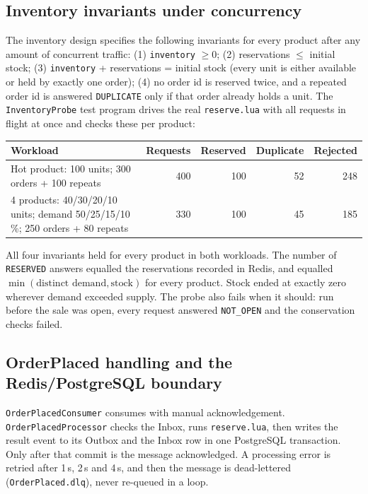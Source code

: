 \documentclass[a4paper]{report}
\begin{document}
\subsection{Inventory invariants under concurrency}

The inventory design specifies the following invariants for every product
after any amount of concurrent traffic:
(1) \texttt{inventory} $\ge 0$;
(2) reservations $\le$ initial stock;
(3) \texttt{inventory} + reservations = initial stock (every unit is either
available or held by exactly one order);
(4) no order id is reserved twice, and a repeated order id is answered
\texttt{DUPLICATE} only if that order already holds a unit.
The \texttt{InventoryProbe} test program drives the real \texttt{reserve.lua}
with all requests in flight at once and checks these per product:

\begin{center}
\begin{tabular}{@{}p{6.2cm}rrrr@{}}
\toprule
Workload & Requests & Reserved & Duplicate & Rejected \\
\midrule
Hot product: 100 units; 300 orders + 100 repeats & 400 & 100 & 52 & 248 \\
4 products: 40/30/20/10 units; demand 50/25/15/10\,\%; 250 orders + 80 repeats & 330 & 100 & 45 & 185 \\
\bottomrule
\end{tabular}
\end{center}

All four invariants held for every product in both workloads. The number of \texttt{RESERVED} answers equalled the
reservations recorded in Redis, and equalled $\min(\text{distinct demand},
\text{stock})$ for every product. Stock ended at exactly zero wherever demand
exceeded supply. The probe also fails when it should: run before the sale was
open, every request answered \texttt{NOT\_OPEN} and the conservation checks
failed.

\subsection{OrderPlaced handling and the Redis/PostgreSQL boundary}

\texttt{OrderPlacedConsumer} consumes with manual acknowledgement.
\texttt{OrderPlacedProcessor} checks the Inbox, runs \texttt{reserve.lua},
then writes the result event to its Outbox and the Inbox row in one
PostgreSQL transaction. Only after that commit is the message acknowledged. A
processing error is retried after 1\,s, 2\,s and 4\,s, and then the message is
dead-lettered (\texttt{OrderPlaced.dlq}), never re-queued in a loop.
\end{document}

